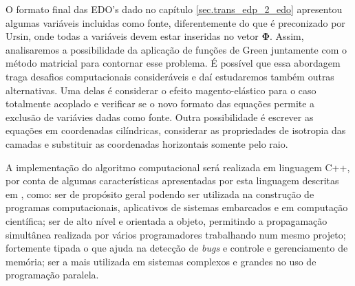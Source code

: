 O formato final das EDO's dado no cap\'itulo \ref{sec.trans_edp_2_edo} apresentou algumas vari\'aveis incluidas como fonte, diferentemente do que \'e preconizado por Ursin, onde todas a vari\'aveis devem estar inseridas no vetor $\mathbf{\Phi}$. Assim, analisaremos a possibilidade da aplica\c{c}\~ao de fun\c{c}\~oes de Green juntamente com o m\'etodo matricial para contornar esse problema. \'E poss\'ivel que essa abordagem traga desafios computacionais consider\'aveis e da\'i estudaremos tamb\'em outras alternativas. Uma delas \'e considerar o efeito magento-el\'astico para o caso totalmente acoplado e verificar se o novo formato das equa\c{c}\~oes permite a exclus\~ao de vari\'avies dadas como fonte. Outra possibilidade \'e escrever as equa\c{c}\~oes em coordenadas cil\'indricas, considerar as propriedades de isotropia das camadas e substituir as coordenadas horizontais somente pelo raio.

A implementa\c{c}\~ao do algoritmo computacional ser\'a realizada em linguagem C++, por conta de algumas caracter\'isticas apresentadas por esta linguagem descritas em \cite{bueno_2015}, como: ser de prop\'osito geral podendo ser utilizada na constru\c{c}\~ao de programas computacionais, aplicativos de sistemas embarcados e em computa\c{c}\~ao cient\'ifica; ser de alto n\'ivel e orientada a objeto, permitindo a propagama\c{c}\~ao simult\^anea realizada por v\'arios programadores trabalhando num mesmo projeto; fortemente tipada o que ajuda na detec\c{c}\~ao de \textit{bugs} e controle e gerenciamento de mem\'oria; ser a mais utilizada em sistemas complexos e grandes no uso de programa\c{c}\~ao paralela.